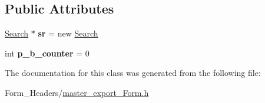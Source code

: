 \subsection*{Public Attributes}
\begin{DoxyCompactItemize}
\item 
\mbox{\label{class_master__export___form_aadf8c31f797a1c2093847a99c7ab884c}} 
\mbox{\hyperlink{class_search}{Search}} $\ast$ {\bfseries sr} = new \mbox{\hyperlink{class_search}{Search}}
\item 
\mbox{\label{class_master__export___form_a65c018cee32920473e3f09863b66340e}} 
int {\bfseries p\+\_\+b\+\_\+counter} = 0
\end{DoxyCompactItemize}


The documentation for this class was generated from the following file\+:\begin{DoxyCompactItemize}
\item 
Form\+\_\+\+Headers/\mbox{\hyperlink{master__export___form_8h}{master\+\_\+export\+\_\+\+Form.\+h}}\end{DoxyCompactItemize}
